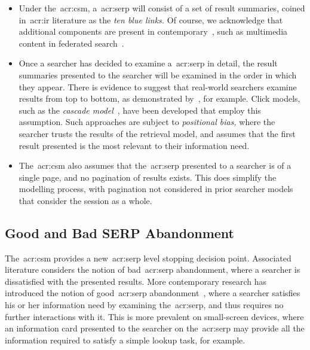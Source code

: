 \begin{itemize}
    
    \item{ Under the~\gls{acr:csm}, a~\gls{acr:serp} will consist of a set of result summaries, coined in~\gls{acr:ir} literature as the \emph{ten blue links.} Of course, we acknowledge that additional components are present in contemporary~, such as multimedia content in federated search~\citep{chen2012federated_search_click_model}.}
    
    \item{ Once a searcher has decided to examine a~\gls{acr:serp} in detail, the result summaries presented to the searcher will be examined in the order in which they appear. There is evidence to suggest that real-world searchers examine results from top to bottom, as demonstrated by~\cite{joachims2002click_model, joachims2005click_model}, for example. Click models, such as the \emph{cascade model}~\citep{craswell2008click_models}, have been developed that employ this assumption. Such approaches are subject to \emph{positional bias,} where the searcher trusts the results of the retrieval model, and assumes that the first result presented is the most relevant to their information need.}
    
    \item{ The~\gls{acr:csm} also assumes that the~\gls{acr:serp} presented to a searcher is of a single page, and no pagination of results exists. This does simplify the modelling process, with pagination not considered in prior searcher models that consider the session as a whole.}
    
\end{itemize}

\subsection{Good and Bad SERP Abandonment}
The~\gls{acr:csm} provides a new~\gls{acr:serp} level stopping decision point. Associated literature considers the notion of bad~\gls{acr:serp} abandonment, where a searcher is dissatisfied with the presented results. More contemporary research has introduced the notion of good~\gls{acr:serp} abandonment~\citep{khabsa2016good_abandonment}, where a searcher satisfies his or her information need by examining the~\gls{acr:serp}, and thus requires no further interactions with it. This is more prevalent on small-screen devices, where an information card presented to the searcher on the~\gls{acr:serp} may provide all the information required to satisfy a simple lookup task, for example.

